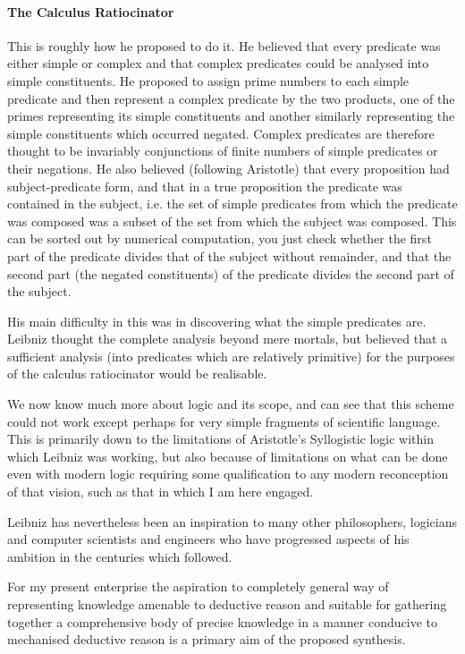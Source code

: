 \documentclass[10pt,titlepage]{book}
\begin{document}
\paragraph{The Calculus Ratiocinator}
This is roughly how he proposed to do it. He believed that every predicate was either simple or complex and that complex predicates could be analysed into simple constituents. He proposed to assign prime numbers to each simple predicate and then represent a complex predicate by the two products, one of the primes representing its simple constituents and another similarly representing the simple constituents which occurred negated.
Complex predicates are therefore thought to be invariably conjunctions of finite numbers of simple predicates or their negations.
He also believed (following Aristotle) that every proposition had subject-predicate form, and that in a true proposition the predicate was contained in the subject, i.e. the set of simple predicates from which the predicate was composed was a subset of the set from which the subject was composed. This can be sorted out by numerical computation, you just check whether the first part of the predicate divides that of the subject without remainder, and that the second part (the negated constituents) of the predicate divides the second part of the subject.

His main difficulty in this was in discovering what the simple predicates are. Leibniz thought the complete analysis beyond mere mortals, but believed that a sufficient analysis (into predicates which are relatively primitive) for the purposes of the calculus ratiocinator would be realisable.

We now know much more about logic and its scope, and can see that this scheme could not work except perhaps for very simple fragments of scientific language.
This is primarily down to the limitations of Aristotle's Syllogistic logic within which Leibniz was working, but also because of limitations on what can be done even with modern logic requiring some qualification to any modern reconception of that vision, such as that in which I am here engaged.

Leibniz has nevertheless been an inspiration to many other philosophers, logicians and computer scientists and engineers who have progressed aspects of his ambition in the centuries which followed.

For my present enterprise the aspiration to completely general way of representing knowledge amenable to deductive reason and suitable for gathering together a comprehensive body of precise knowledge in a manner conducive to mechanised deductive reason is a primary aim of the proposed synthesis.
\end{document}
